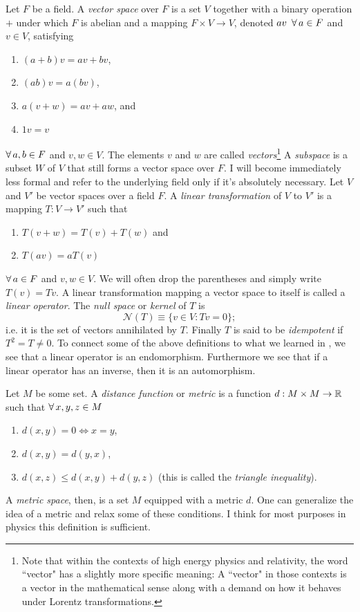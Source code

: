   Let $F$ be a field. A {\it vector space} over $F$ is a set
  $V$ together with a binary operation $+$ under which $F$ is abelian and a
  mapping $F\times V\to V$, denoted $av\ \operatorname{\forall} a\in F$ and $v\in V$,
  satisfying
  \begin{enumerate}
    \item $(a+b)v=av+bv$,
    \item $(ab)v=a(bv)$,
    \item $a(v+w)=av+aw$, and
    \item $1v=v$
  \end{enumerate}
  $\operatorname{\forall} a,b\in F$ and $v,w\in V$. The elements $v$ and $w$ are
  called {\it vectors}\footnote{Note that within the contexts of high
  energy physics and relativity, the word ``vector" has a slightly more
  specific meaning: A ``vector" in those contexts is a vector in the
  mathematical sense along with a demand on how it behaves under
  Lorentz transformations.} A {\it subspace}
  is a subset $W$ of
  $V$ that still forms a vector space over $F$. I will become immediately
  less formal and refer to the underlying field only if it's absolutely
  necessary.
  Let $V$ and $V'$ be vector spaces over a field $F$. A
  {\it linear transformation}
  of $V$ to $V'$ is a mapping $T : V\to V'$ such that
  \begin{enumerate}
    \item $T(v+w)=T(v)+T(w)$ and
    \item $T(av)=aT(v)$
  \end{enumerate}
  $\operatorname{\forall} a\in F$ and $v,w\in V$. We will often drop the parentheses
  and simply write $T(v)=Tv$. A linear transformation mapping a
  vector space to itself is called a {\it linear operator}.
  The {\it null space} or {\it kernel} of $T$ is
  \begin{equation}
    \mathcal{N}(T)\equiv\{v\in V:Tv=0\};
  \end{equation}
  i.e. it is the set of vectors annihilated by $T$. Finally $T$ is said
  to be {\it idempotent} if $T^2=T\neq0$.
To connect some of the above definitions to what we learned in
, we see that a linear operator is an endomorphism.
Furthermore we see that if a linear operator has an inverse, then it
is an automorphism.

  Let $M$ be some set. A {\it distance function} or {\it metric}
  is a function
  $d:M\times M\to \mathbb{R}$
  such that $\operatorname{\forall} x,y,z\in M$
  \begin{enumerate}
    \item $d(x,y)=0\Leftrightarrow x=y$,
    \item $d(x,y)=d(y,x)$,
    \item $d(x,z)\leq d(x,y)+d(y,z)$ (this is called the {\it triangle
          inequality}).
  \end{enumerate}
  A {\it metric space}, then, is a set $M$ equipped with a metric $d$.
One can generalize the idea of a metric and relax some of these
conditions. I think for most purposes in physics this definition is sufficient.

